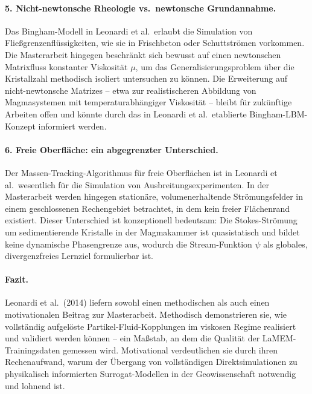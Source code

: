 \documentclass[a4paper,12pt]{article}
\begin{document}
\paragraph{5. Nicht-newtonsche Rheologie vs.\ newtonsche Grundannahme.}
Das Bingham-Modell in Leonardi et al.\ erlaubt die Simulation von
Fließgrenzenflüssigkeiten, wie sie in Frischbeton oder Schuttströmen vorkommen.
Die Masterarbeit hingegen beschränkt sich bewusst auf einen newtonschen
Matrixfluss konstanter Viskosität $\mu$, um das Generalisierungsproblem über
die Kristallzahl methodisch isoliert untersuchen zu können. Die Erweiterung auf
nicht-newtonsche Matrizes -- etwa zur realistischeren Abbildung von
Magmasystemen mit temperaturabhängiger Viskosität -- bleibt für zukünftige
Arbeiten offen und könnte durch das in Leonardi et al.\ etablierte Bingham-LBM-Konzept informiert werden.

\paragraph{6. Freie Oberfläche: ein abgegrenzter Unterschied.}
Der Massen-Tracking-Algorithmus für freie Oberflächen ist in Leonardi et al.\
wesentlich für die Simulation von Ausbreitungsexperimenten. In der
Masterarbeit werden hingegen stationäre, volumenerhaltende Strömungsfelder
in einem geschlossenen Rechengebiet betrachtet, in dem kein freier Flächenrand
existiert. Dieser Unterschied ist konzeptionell bedeutsam: Die
Stokes-Strömung um sedimentierende Kristalle in der Magmakammer ist
quasistatisch und bildet keine dynamische Phasengrenze aus, wodurch die
Stream-Funktion $\psi$ als globales, divergenzfreies Lernziel formulierbar ist.

\paragraph{Fazit.}
Leonardi et al.\ (2014) liefern sowohl einen methodischen als auch einen
motivationalen Beitrag zur Masterarbeit. Methodisch demonstrieren sie, wie
vollständig aufgelöste Partikel-Fluid-Kopplungen im viskosen Regime realisiert
und validiert werden können -- ein Maßstab, an dem die Qualität der
LaMEM-Trainingsdaten gemessen wird. Motivational verdeutlichen sie durch ihren
Rechenaufwand, warum der Übergang von vollständigen Direktsimulationen zu
physikalisch informierten Surrogat-Modellen in der Geowissenschaft notwendig
und lohnend ist.
\end{document}
